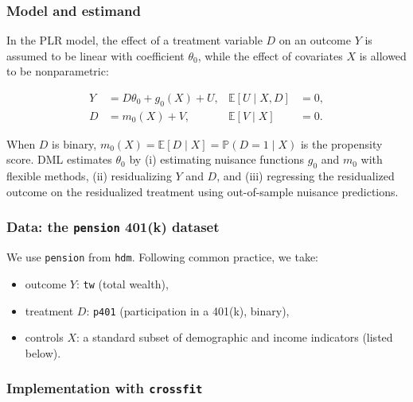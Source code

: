 \subsubsection{Model and estimand}\label{model-and-estimand}

In the PLR model, the effect of a treatment variable \(D\) on an outcome \(Y\) is assumed to be linear with coefficient \(\theta_0\), while the effect of covariates \(X\) is allowed to be nonparametric:

\begin{equation}
\begin{aligned}
Y &= D \theta_0 + g_0(X) + U,
& \mathbb{E}[U \mid X,D] &= 0,\\
D &= m_0(X) + V,
& \mathbb{E}[V \mid X] &= 0.
\end{aligned}
\label{eq:plr-model}
\end{equation}

When \(D\) is binary, \(m_0(X) = \mathbb{E}\left[D \mid X\right] = \mathbb{P}\left(D=1 \mid X\right)\) is the propensity score. DML estimates \(\theta_0\) by (i) estimating nuisance functions \(g_0\) and \(m_0\) with flexible methods, (ii) residualizing \(Y\) and \(D\), and (iii) regressing the residualized outcome on the residualized treatment using out-of-sample nuisance predictions.

\subsubsection{\texorpdfstring{Data: the \texttt{pension} 401(k) dataset}{Data: the pension 401(k) dataset}}\label{data-the-pension-401k-dataset}

We use \texttt{pension} from \texttt{hdm}. Following common practice, we take:

\begin{itemize}
\tightlist
\item
  outcome \(Y\): \texttt{tw} (total wealth),
\item
  treatment \(D\): \texttt{p401} (participation in a 401(k), binary),
\item
  controls \(X\): a standard subset of demographic and income indicators (listed below).
\end{itemize}

\subsubsection{\texorpdfstring{Implementation with \texttt{crossfit}}{Implementation with crossfit}}\label{implementation-with-crossfit}

